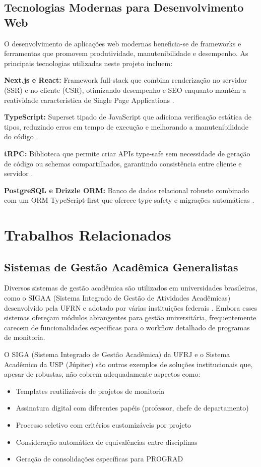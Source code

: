 \documentclass[portuguese]{sbc2025}%
\begin{document}
\subsection{Tecnologias Modernas para Desenvolvimento Web}

O desenvolvimento de aplicações web modernas beneficia-se de frameworks e ferramentas que promovem produtividade, manutenibilidade e desempenho. As principais tecnologias utilizadas neste projeto incluem:

\textbf{Next.js e React:} Framework full-stack que combina renderização no servidor (SSR) e no cliente (CSR), otimizando desempenho e SEO enquanto mantém a reatividade característica de Single Page Applications \cite{Vercel2024}.

\textbf{TypeScript:} Superset tipado de JavaScript que adiciona verificação estática de tipos, reduzindo erros em tempo de execução e melhorando a manutenibilidade do código \cite{Microsoft2024}.

\textbf{tRPC:} Biblioteca que permite criar APIs type-safe sem necessidade de geração de código ou schemas compartilhados, garantindo consistência entre cliente e servidor \cite{TRPC2024}.

\textbf{PostgreSQL e Drizzle ORM:} Banco de dados relacional robusto combinado com um ORM TypeScript-first que oferece type safety e migrações automáticas \cite{PostgreSQL2024, Drizzle2024}.

\section{Trabalhos Relacionados}
\label{sec:related-work}

\subsection{Sistemas de Gestão Acadêmica Generalistas}

Diversos sistemas de gestão acadêmica são utilizados em universidades brasileiras, como o SIGAA (Sistema Integrado de Gestão de Atividades Acadêmicas) desenvolvido pela UFRN e adotado por várias instituições federais \cite{UFRN2024}. Embora esses sistemas ofereçam módulos abrangentes para gestão universitária, frequentemente carecem de funcionalidades específicas para o workflow detalhado de programas de monitoria.

O SIGA (Sistema Integrado de Gestão Acadêmica) da UFRJ e o Sistema Acadêmico da USP (Júpiter) são outros exemplos de soluções institucionais que, apesar de robustas, não cobrem adequadamente aspectos como:
\begin{itemize}
  \item Templates reutilizáveis de projetos de monitoria
  \item Assinatura digital com diferentes papéis (professor, chefe de departamento)
  \item Processo seletivo com critérios customizáveis por projeto
  \item Consideração automática de equivalências entre disciplinas
  \item Geração de consolidações específicas para PROGRAD
\end{itemize}
\end{document}
